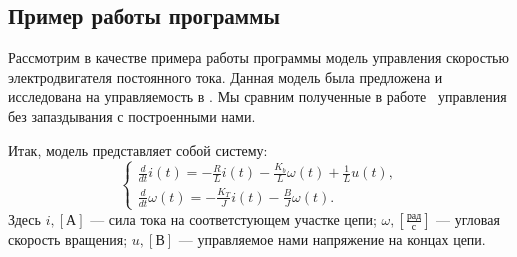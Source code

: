 \subsection{Пример работы программы}

Рассмотрим в качестве примера работы программы модель управления скоростью электродвигателя постоянного тока. Данная модель была предложена и исследована на управляемость в \cite{baghdad}. Мы сравним полученные в работе~\cite{baghdad} управления без запаздывания с построенными нами.

Итак, модель представляет собой систему:
\begin{equation}\label{eq:example}
\begin{cases}
\frac{d}{dt}i(t)
=
-\frac{R}{L}i(t)
-
\frac{K_b}{L}\omega(t)
+
\frac{1}{L}u(t),\\
\frac{d}{dt}\omega(t)
=
-\frac{K_T}{J}i(t)
-
\frac{B}{J}\omega(t).
\end{cases}
\end{equation}
Здесь $i,[\mbox{А}]$ --- сила тока на соответстующем участке цепи; $\omega,\left[\frac{\mbox{рад}}{\mbox{с}}\right]$ --- угловая скорость вращения; $u,[\mbox{В}]$ --- управляемое нами напряжение на концах цепи. 

